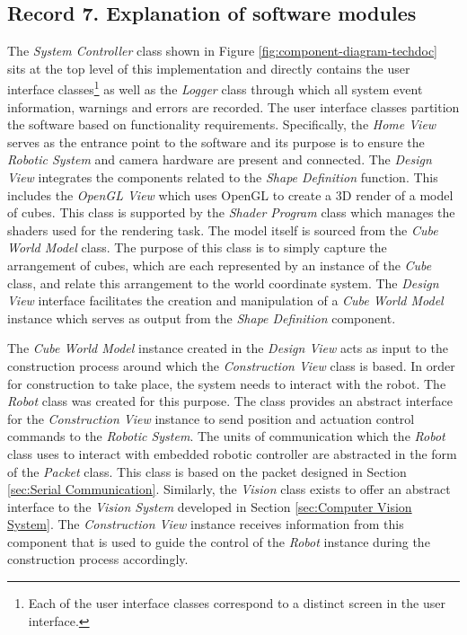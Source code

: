 \newpage

\subsection{Record 7. Explanation of software modules}

The \textit{System Controller} class shown in Figure \ref{fig:component-diagram-techdoc} sits at the top level of this implementation and directly contains the user interface classes\footnote{Each of the user interface classes correspond to a distinct screen in the user interface.} as well as the \textit{Logger} class through which all system event information, warnings and errors are recorded. The user interface classes partition the software based on functionality requirements. Specifically, the \textit{Home View} serves as the entrance point to the software and its purpose is to ensure the \textit{Robotic System} and camera hardware are present and connected. The \textit{Design View} integrates the components related to the \textit{Shape Definition} function. This includes the \textit{OpenGL View} which uses OpenGL to create a 3D render of a model of cubes. This class is supported by the \textit{Shader Program} class which manages the shaders used for the rendering task. The model itself is sourced from the \textit{Cube World Model} class. The purpose of this class is to simply capture the arrangement of cubes, which are each represented by an instance of the \textit{Cube} class, and relate this arrangement to the world coordinate system. The \textit{Design View} interface facilitates the creation and manipulation of a \textit{Cube World Model} instance which serves as output from the \textit{Shape Definition} component.

The \textit{Cube World Model} instance created in the \textit{Design View} acts as input to the construction process around which the \textit{Construction View} class is based. In order for construction to take place, the system needs to interact with the robot. The \textit{Robot} class was created for this purpose. The class provides an abstract interface for the \textit{Construction View} instance to send position and actuation control commands to the \textit{Robotic System}. The units of communication which the \textit{Robot} class uses to interact with embedded robotic controller are abstracted in the form of the \textit{Packet} class. This class is based on the packet designed in Section \ref{sec:Serial Communication}. Similarly, the \textit{Vision} class exists to offer an abstract interface to the \textit{Vision System} developed in Section \ref{sec:Computer Vision System}. The \textit{Construction View} instance receives information from this component that is used to guide the control of the \textit{Robot} instance during the construction process accordingly.

